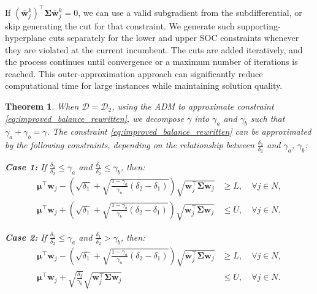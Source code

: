 \documentclass[preprint,12pt,authoryear]{elsarticle}
\newtheorem{theorem}{Theorem}
\begin{document}
If $(\bar{\mathbf{w}}_j^k)^\top \boldsymbol{\Sigma} \bar{\mathbf{w}}_j^k = 0$, we can use a valid subgradient from the subdifferential, or skip generating the cut for that constraint. We generate such supporting-hyperplane cuts separately for the lower and upper SOC constraints whenever they are violated at the current incumbent. The cuts are added iteratively, and the process continues until convergence or a maximum number of iterations is reached. This outer-approximation approach can significantly reduce computational time for large instances while maintaining solution quality.

\begin{theorem}\label{thm:improved_balance_d2}
When $\mathcal{D} = \mathcal{D}_2$, using the ADM to approximate constraint \eqref{eq:improved_balance_rewritten}, we decompose $\gamma$ into $\gamma_a$ and $\gamma_b$ such that $\gamma_a + \gamma_b = \gamma$. The constraint \eqref{eq:improved_balance_rewritten} can be approximated by the following constraints, depending on the relationship between $\frac{\delta_1}{\delta_2}$ and $\gamma_a$, $\gamma_b$:

\textbf{Case 1:} If $\frac{\delta_1}{\delta_2} \leqslant \gamma_a$ and $\frac{\delta_1}{\delta_2} \leqslant \gamma_b$, then:
\begin{align}
\boldsymbol{\mu}^\top \mathbf{w}_j - \left(\sqrt{\delta_1} + \sqrt{\frac{1 - \gamma_a}{\gamma_a} (\delta_2 - \delta_1)}\right) \sqrt{\mathbf{w}_j^\top \boldsymbol{\Sigma} \mathbf{w}_j} &\geqslant L, \quad \forall j \in N, \label{eq:improved_balance_d2_case1_lower} \\
\boldsymbol{\mu}^\top \mathbf{w}_j + \left(\sqrt{\delta_1} + \sqrt{\frac{1 - \gamma_b}{\gamma_b} (\delta_2 - \delta_1)}\right) \sqrt{\mathbf{w}_j^\top \boldsymbol{\Sigma} \mathbf{w}_j} &\leqslant U, \quad \forall j \in N. \label{eq:improved_balance_d2_case1_upper}
\end{align}

\textbf{Case 2:} If $\frac{\delta_1}{\delta_2} \leqslant \gamma_a$ and $\frac{\delta_1}{\delta_2} > \gamma_b$, then:
\begin{align}
\boldsymbol{\mu}^\top \mathbf{w}_j - \left(\sqrt{\delta_1} + \sqrt{\frac{1 - \gamma_a}{\gamma_a} (\delta_2 - \delta_1)}\right) \sqrt{\mathbf{w}_j^\top \boldsymbol{\Sigma} \mathbf{w}_j} &\geqslant L, \quad \forall j \in N, \label{eq:improved_balance_d2_case2_lower} \\
\boldsymbol{\mu}^\top \mathbf{w}_j + \sqrt{\frac{\delta_2}{\gamma_b}} \sqrt{\mathbf{w}_j^\top \boldsymbol{\Sigma} \mathbf{w}_j} &\leqslant U, \quad \forall j \in N. \label{eq:improved_balance_d2_case2_upper}
\end{align}


\end{theorem}
\end{document}
